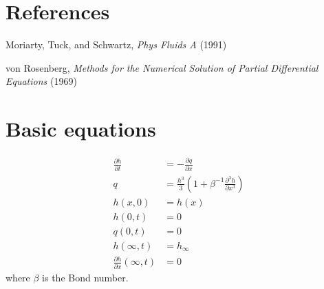 \documentclass[12pt]{article}
\numberwithin{equation}{section}
\begin{document}
\maketitle

\allowdisplaybreaks[1]

\renewcommand*{\thefootnote}{\fnsymbol{footnote}}





\section{References}

Moriarty, Tuck, and Schwartz, {\it Phys Fluids A} (1991)

\noindent
von Rosenberg, {\it Methods for the Numerical Solution of Partial Differential Equations} (1969)

\section{Basic equations}

\begin{align}
	\frac{\partial h}{\partial t} &= - \frac{\partial q}{\partial x} 
	\\
	q &= \frac{h^3}{3} \left( 1 + \beta^{-1} \frac{\partial^3 h}{\partial x^3} \right)
	\\
	h(x,0) &= h(x)
	\\
	h(0,t) &= 0
	\\
	q(0,t) &=0
	\\
	h(\infty, t) &= h_\infty
	\\
	\frac{\partial h}{\partial x} (\infty, t)& = 0
\end{align}
where $\beta$ is the Bond number.
\end{document}
